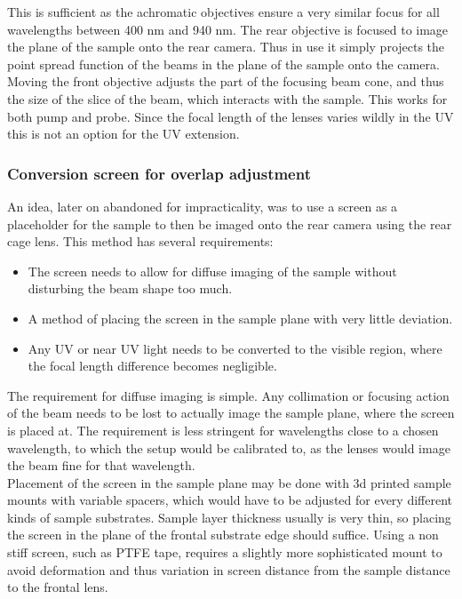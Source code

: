 \documentclass[twoside,openright]{scrreprt}
\begin{document}
This is sufficient as the achromatic objectives ensure a very similar focus for all wavelengths between 400 nm and 940 nm. The rear objective is focused to image the plane of the sample onto the rear camera. Thus in use it simply projects the point spread function of the beams in the plane of the sample onto the camera. Moving the front objective adjusts the part of the focusing beam cone, and thus the size of the slice of the beam, which interacts with the sample. This works for both pump and probe. Since the focal length of the lenses varies wildly in the UV this is not an option for the UV extension.
\subsubsection{Conversion screen for overlap adjustment}
An idea, later on abandoned for impracticality, was to use a screen as a placeholder for the sample to then be imaged onto the rear camera using the rear cage lens. This method has several requirements:
\begin{itemize}
\item The screen needs to allow for diffuse imaging of the sample without disturbing the beam shape too much.
\item A method of placing the screen in the sample plane with very little deviation.
\item Any UV or near UV light needs to be converted to the visible region, where the focal length difference becomes negligible.
\end{itemize}

The requirement for diffuse imaging is simple. Any collimation or focusing action of the beam needs to be lost to actually image the sample plane, where the screen is placed at. The requirement is less stringent for wavelengths close to a chosen wavelength, to which the setup would be calibrated to, as the lenses would image the beam fine for that wavelength.\\

Placement of the screen in the sample plane may be done with 3d printed sample mounts with variable spacers, which would have to be adjusted for every different kinds of sample substrates. Sample layer thickness usually is very thin, so placing the screen in the plane of the frontal substrate edge should suffice. Using a non stiff screen, such as PTFE tape, requires a slightly more sophisticated mount to avoid deformation and thus variation in screen distance from the sample distance to the frontal lens. 
\end{document}
